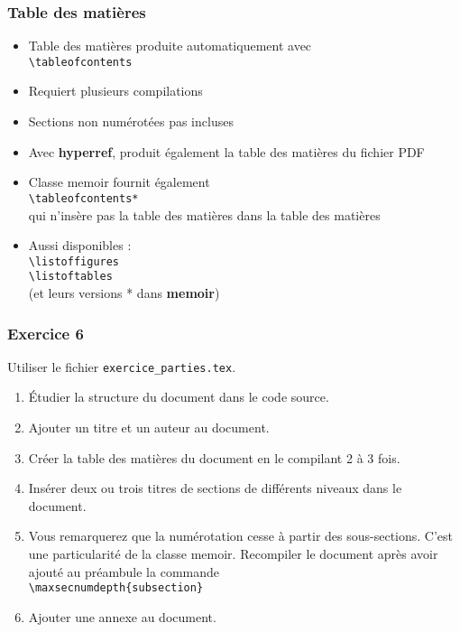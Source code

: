 \begin{frame}[fragile]

	\frametitle{Table des matières}
	
	\begin{itemize}
		\item Table des matières produite automatiquement avec \\
		\lstinline|\tableofcontents|
		\item Requiert plusieurs compilations
		\item Sections non numérotées pas incluses
		\item Avec \textbf{hyperref}, produit également la table des matières du fichier PDF
		
		\pause
		
		\item Classe memoir fournit également \\
		\lstinline|\tableofcontents*| \\
		qui n’insère pas la table des matières dans la table des matières
		
		\pause
		
		\item Aussi disponibles : \\
		\lstinline|\listoffigures| \\
		\lstinline|\listoftables| \\
		(et leurs versions * dans \textbf{memoir})
	\end{itemize}
\end{frame}


\begin{frame}[fragile]
	
	\frametitle{Exercice 6}	
	Utiliser le fichier \texttt{exercice\_parties.tex}.	
	
	\begin{enumerate}
		\item Étudier la structure du document dans le code source.
		\item Ajouter un titre et un auteur au document.
		\item Créer la table des matières du document en le compilant 2 à 3	fois.
		\item Insérer deux ou trois titres de sections de différents niveaux dans le document.
		\item Vous remarquerez que la numérotation cesse à partir des sous-sections. C’est une particularité de la classe memoir. Recompiler le document après avoir ajouté au préambule la
		commande \\
		\lstinline|\maxsecnumdepth{subsection}|
		\item Ajouter une annexe au document.
	\end{enumerate}

\end{frame}

